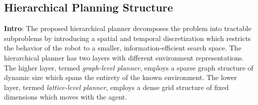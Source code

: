 \documentclass{article}
\newcommand{\ph}[1]{{\textbf{#1}:}} %
\begin{document}








\subsection{Hierarchical Planning Structure} 
\ph{Intro} The proposed hierarchical planner decomposes the problem into tractable subproblems by introducing a spatial and temporal discretization which restricts the behavior of the robot to a smaller, information-efficient search space. The hierarchical planner has two layers with different environment representations. The higher layer, termed \emph{graph-level planner}, employs a sparse graph structure of dynamic size which spans the entirety of the known environment. The lower layer, termed \emph{lattice-level planner}, employs a dense grid structure of fixed dimensions which moves with the agent. 
\end{document}
